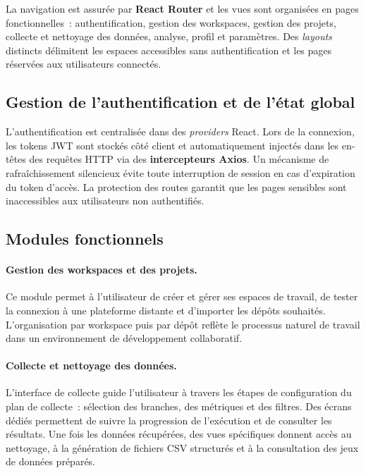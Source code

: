 La navigation est assurée par \textbf{React Router} et les vues sont organisées en pages
fonctionnelles~: authentification, gestion des workspaces, gestion des projets, collecte et
nettoyage des données, analyse, profil et paramètres. Des \textit{layouts} distincts délimitent
les espaces accessibles sans authentification et les pages réservées aux utilisateurs connectés.

\subsection{Gestion de l'authentification et de l'état global}

L'authentification est centralisée dans des \textit{providers} React. Lors de la connexion, les
tokens JWT sont stockés côté client et automatiquement injectés dans les en-têtes des requêtes
HTTP via des \textbf{intercepteurs Axios}. Un mécanisme de rafraîchissement silencieux évite toute
interruption de session en cas d'expiration du token d'accès. La protection des routes garantit
que les pages sensibles sont inaccessibles aux utilisateurs non authentifiés.

\subsection{Modules fonctionnels}

\paragraph{Gestion des workspaces et des projets.} Ce module permet à l'utilisateur de créer et
gérer ses espaces de travail, de tester la connexion à une plateforme distante et d'importer les
dépôts souhaités. L'organisation par workspace puis par dépôt reflète le processus naturel de
travail dans un environnement de développement collaboratif.

\paragraph{Collecte et nettoyage des données.} L'interface de collecte guide l'utilisateur à
travers les étapes de configuration du plan de collecte~: sélection des branches, des métriques
et des filtres. Des écrans dédiés permettent de suivre la progression de l'exécution et de
consulter les résultats. Une fois les données récupérées, des vues spécifiques donnent accès au
nettoyage, à la génération de fichiers CSV structurés et à la consultation des jeux de données
préparés.

